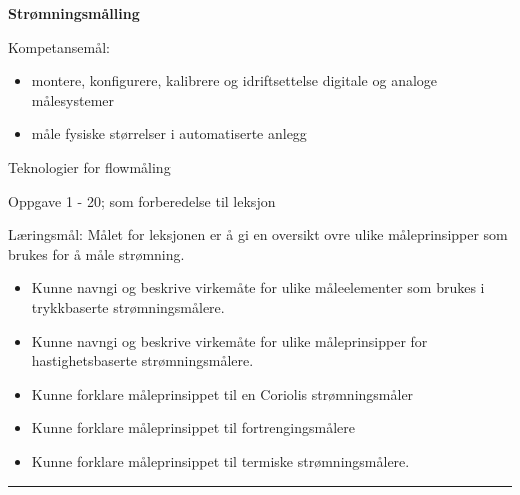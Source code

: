 \documentclass[12pt,a4paper]{article}
\begin{document}
\centerline{\bf Strømningsmålling}  \bigskip

Kompetansemål:
\begin{itemize}[noitemsep]

	\item montere, konfigurere, kalibrere og idriftsettelse digitale og analoge målesystemer
	\item måle fysiske størrelser i automatiserte anlegg
\end{itemize}
\vskip 2cm

\noindent {}

\vskip 5pt


\vskip 2pt  Teknologier for flowmåling

\vskip 2pt \noindent Oppgave 1 - 20;  som forberedelse til leksjon %

\vskip 10pt

	Læringsmål:
	Målet for leksjonen er å gi en oversikt ovre ulike måleprinsipper som brukes for å måle strømning. 
	\begin{itemize}[noitemsep]
		\item Kunne navngi og beskrive virkemåte for ulike måleelementer som brukes i trykkbaserte strømningsmålere.%
		\item Kunne navngi og beskrive virkemåte for ulike måleprinsipper for hastighetsbaserte strømningsmålere.
		\item Kunne forklare måleprinsippet til en Coriolis strømningsmåler
		\item Kunne forklare måleprinsippet til fortrengingsmålere
		\item Kunne forklare måleprinsippet til termiske strømningsmålere. 
	\end{itemize}


\filbreak
\hrule \vskip 5pt
\noindent {}

\vskip 5pt

\end{document}
